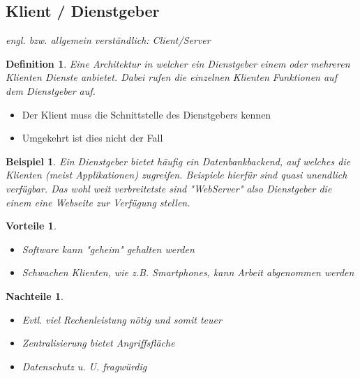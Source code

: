 \documentclass[a4paper]{article}
\theoremstyle{break}
\newtheorem{defi}{Definition}[section]
\newtheorem{ex}{Beispiel}[section]
\newtheorem{why}{Vorteile}[section]
\newtheorem{whynot}{Nachteile}[section]
\begin{document}
\subsection{Klient / Dienstgeber}
\textit{engl. bzw. allgemein verständlich: Client/Server}
\begin{defi}
	Eine Architektur in welcher ein Dienstgeber einem oder mehreren Klienten Dienste anbietet. Dabei rufen die einzelnen Klienten Funktionen auf dem Dienstgeber auf.
\end{defi}
\begin{itemize}
	\item Der Klient muss die Schnittstelle des Dienstgebers kennen
	\item Umgekehrt ist dies nicht der Fall
\end{itemize}
\begin{ex}
	Ein Dienstgeber bietet häufig ein Datenbankbackend, auf welches die Klienten (meist Applikationen) zugreifen. Beispiele hierfür sind quasi unendlich verfügbar. Das wohl weit verbreitetste sind "WebServer" also Dienstgeber die einem eine Webseite zur Verfügung stellen.
\end{ex}
\begin{why}
	\begin{itemize}
		\item Software kann "geheim" gehalten werden
		\item Schwachen Klienten, wie z.B. Smartphones, kann Arbeit abgenommen werden
	\end{itemize}
\end{why}
\begin{whynot}
	\begin{itemize}
		\item Evtl. viel Rechenleistung nötig und somit teuer
		\item Zentralisierung bietet Angriffsfläche
		\item Datenschutz u. U. fragwürdig
	\end{itemize}
\end{whynot}
\end{document}
